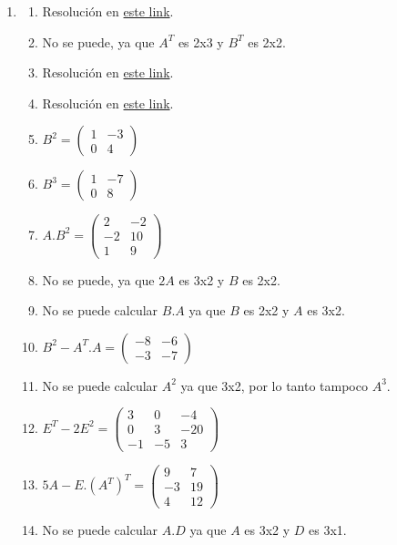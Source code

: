 \documentclass[a4paper]{article}
\newcommand{\exercise}{\item}
\begin{document}
\begin{enumerate}
\begin{enumerate} [label=(\alph*)]
		\item No es posible, ya que A tiene tamaño 2x3 y $B^{\dagger}$ tiene tamaño 3x2. 
\end{enumerate}\exercise\begin{enumerate} [label=(\alph*)]		\item Resolución en \href{https://youtu.be/-55zVuwssEs}{este link}.
		\item No se puede, ya que $A^T$ es 2x3 y $B^T$ es 2x2.
		\item Resolución en \href{https://youtu.be/-55zVuwssEs}{este link}.
		\item Resolución en \href{https://youtu.be/-55zVuwssEs}{este link}.
		\item $B^2=\left(\begin{matrix} 1 & -3\\ 0 & 4 \end{matrix}\right)$
		\item $B^3=\left(\begin{matrix} 1 & -7\\ 0 & 8 \end{matrix}\right)$
		\item $A.B^2=\left(\begin{matrix} 2 & -2\\ -2 & 10 \\ 1 & 9 \end{matrix}\right)$
		\item No se puede, ya que $2A$ es 3x2 y $B$ es 2x2.
		\item No se puede calcular $B.A$ ya que $B$ es 2x2 y $A$ es 3x2.
		\item $B^2 - A^T.A=\left(\begin{matrix} -8 & -6\\ -3 & -7 \end{matrix}\right)$
		\item No se puede calcular $A^2$ ya que 3x2, por lo tanto tampoco $A^3$.
		\item $E^T-2E^2=\left(\begin{matrix} 3 & 0 & -4 \\ 0 & 3 & -20 \\ -1 & -5 & 3 \end{matrix}\right)$ 
		\item $5A-E.(A^T)^T=\left(\begin{matrix} 9 & 7\\ -3 & 19 \\ 4 & 12 \end{matrix}\right)$
		\item No se puede calcular $A.D$ ya que $A$ es 3x2 y $D$ es 3x1.

\end{enumerate}
\end{enumerate}
\end{document}
